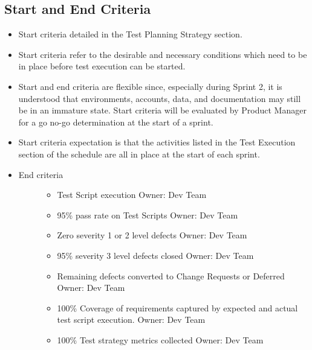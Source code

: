 \documentclass[letterpaper,10pt,english]{sphinxmanual}
\begin{document}
\subsection{Start and End Criteria}
\label{\detokenize{test_plan/issue_management:start-and-end-criteria}}\begin{itemize}
\item {} 
Start criteria detailed in the Test Planning Strategy section.

\item {} 
Start criteria refer to the desirable and necessary conditions which need to be in place before test execution can be started.

\item {} 
Start and end criteria are flexible since, especially during Sprint 2, it is understood that environments, accounts, data, and documentation may still be in an immature state.  Start criteria will be evaluated by Product Manager for a go no-go determination at the start of a sprint.

\item {} 
Start criteria expectation is that the activities listed in the Test Execution section of the schedule are all in place at the start of each sprint.

\item {} \begin{description}
\item[{End criteria}] \leavevmode\begin{itemize}
\item {} 
Test Script execution     Owner: Dev Team

\item {} 
95\% pass rate on Test Scripts             Owner: Dev Team

\item {} 
Zero severity 1 or 2 level defects                Owner: Dev Team

\item {} 
95\% severity 3 level defects closed               Owner: Dev Team

\item {} 
Remaining defects converted to Change Requests or Deferred   Owner: Dev Team

\item {} 
100\% Coverage of requirements captured by expected and actual test script execution.                              Owner: Dev Team

\item {} 
100\% Test strategy metrics collected      Owner: Dev Team


\end{itemize}
\end{description}
\end{itemize}
\end{document}
